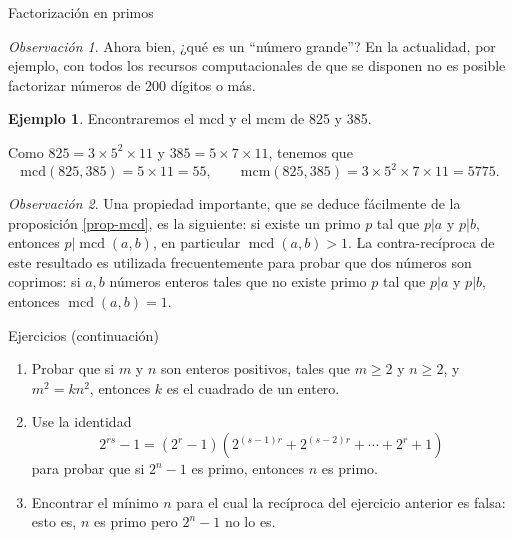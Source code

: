 \documentclass[11pt,spanish,makeidx]{amsbook}
\theoremstyle{definition}
\newtheorem{ejemplo}{Ejemplo}[section]
\theoremstyle{remark}
\newtheorem{observacion}{Observaci\'on}[section]
\newcommand \mcd{\operatorname{mcd}}
\begin{document}
\begin{section}{Factorización en primos}
\begin{observacion}
 Ahora bien, ¿qué es un ``número grande''? En la actualidad, por ejemplo, con todos los recursos computacionales de que se disponen no es posible factorizar números de 200 dígitos o más.     
\end{observacion}

\begin{ejemplo}
Encontraremos el mcd y el mcm  de 825 y 385.

Como $825 =  3\times5^2\times11$ y $385 = 5\times 7\times11$, tenemos que
$$
\text{mcd}(825,385) = 5\times11 = 55, \qquad \text{mcm}(825,385) = 3\times5^2\times 7\times11 = 5775.
$$
\end{ejemplo}

\begin{observacion}
	Una propiedad importante, que se deduce fácilmente de la proposición \ref{prop-mcd}, es la siguiente: si  existe un primo $p$ tal que $p|a$ y $p|b$,  entonces $p|\mcd(a,b)$,  en particular $\mcd(a,b) >1$. La contra-recíproca de este resultado es utilizada frecuentemente para probar que dos números son coprimos:  si $a,b$ números enteros tales que no existe primo $p$ tal que $p|a$ y $p|b$,  entonces $\mcd(a,b) =1$.
\end{observacion}

\begin{subsection}{Ejercicios} {\rm (continuación)}
\begin{enumerate}
\item Probar que si $m$ y $n$ son enteros positivos, tales que $m\ge 2$ y $n \ge 2$, y $m^2 = kn^2$, entonces $k$ es el cuadrado de un entero.
\item Use la identidad
$$
2^{rs} -1 = (2^r-1) (2^{(s-1)r}+2^{(s-2)r}+\cdots +2^r+1)
$$
para probar que si $2^n-1$ es primo, entonces $n$ es primo.
\item Encontrar el mínimo $n$ para el cual la recíproca del ejercicio anterior es falsa: esto es, $n$ es primo pero $2^n-1$ no lo es.
\end{enumerate}
\end{subsection}
\end{section}
\end{document}
